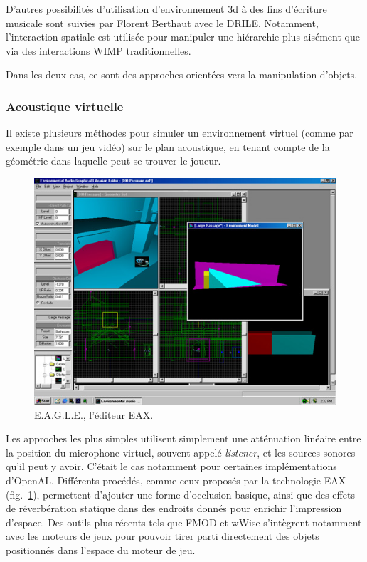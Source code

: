 \documentclass[french,12pt]{article}
\begin{document}
D'autres possibilités d'utilisation d'environnement 3d à des fins d'écriture musicale sont suivies par Florent Berthaut avec le DRILE\cite{berthaut_drile:_2010}. Notamment, l'interaction spatiale est utilisée pour manipuler une hiérarchie plus aisément que via des interactions \ac{WIMP} traditionnelles.

Dans les deux cas, ce sont des approches orientées vers la manipulation d'objets.

\subsubsection{Acoustique virtuelle}
Il existe plusieurs méthodes pour simuler un environnement virtuel (comme par exemple dans un jeu vidéo) sur le plan acoustique, en tenant compte de la géométrie dans laquelle peut se trouver le joueur.

\begin{figure}[h]
    \centering
    \includegraphics[scale=0.65]{images/eax.jpg}
    \caption{E.A.G.L.E., l'éditeur EAX.}
    \label{fig.eax}
\end{figure}

Les approches les plus simples utilisent simplement une atténuation linéaire entre la position du microphone virtuel, souvent appelé \textit{listener}, et les sources sonores qu'il peut y avoir. C'était le cas notamment pour certaines implémentations d'OpenAL\cite{hiebert_openal_2005}. Différents procédés, comme ceux proposés par la technologie EAX\cite{funkhouser_survey_2003} (fig.~\ref{fig.eax}), permettent d'ajouter une forme d'occlusion basique, ainsi que des effets de réverbération statique dans des endroits donnés pour enrichir l'impression d'espace. Des outils plus récents tels que FMOD et wWise s'intègrent notamment avec les moteurs de jeux pour pouvoir tirer parti directement des objets positionnés dans l'espace du moteur de jeu.
\end{document}
